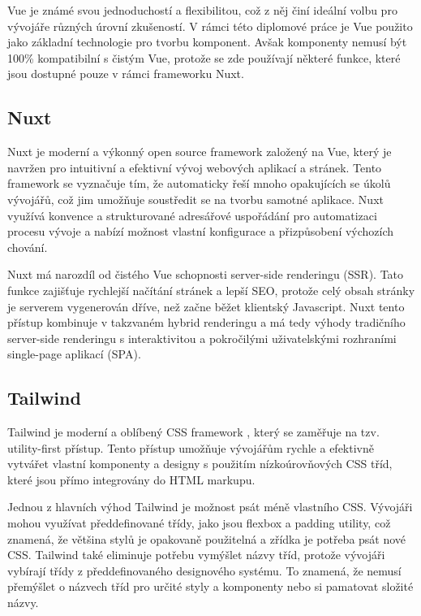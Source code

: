 Vue je známé svou jednoduchostí a flexibilitou, což z něj činí ideální volbu pro vývojáře různých úrovní zkušeností. V rámci této diplomové práce je Vue použito jako základní technologie pro tvorbu komponent. Avšak komponenty nemusí být 100\% kompatibilní s čistým Vue, protože se zde používají některé funkce, které jsou dostupné pouze v rámci frameworku Nuxt.

\subsection{Nuxt}
Nuxt je moderní a výkonný open source framework založený na Vue, který je navržen pro intuitivní a efektivní vývoj webových aplikací a stránek. Tento framework se vyznačuje tím, že automaticky řeší mnoho opakujících se úkolů vývojářů, což jim umožňuje soustředit se na tvorbu samotné aplikace. Nuxt využívá konvence a strukturované adresářové uspořádání pro automatizaci procesu vývoje a nabízí možnost vlastní konfigurace a přizpůsobení výchozích chování.

Nuxt má narozdíl od čistého Vue schopnosti server-side renderingu (SSR). Tato funkce zajišťuje rychlejší načítání stránek a lepší SEO, protože celý obsah stránky je serverem vygenerován dříve, než začne běžet klientský Javascript. Nuxt tento přístup kombinuje v takzvaném hybrid renderingu a má tedy výhody tradičního server-side renderingu s interaktivitou a pokročilými uživatelskými rozhraními single-page aplikací (SPA). \cite{NuxtRenderingModes}

\subsection{Tailwind}
Tailwind je moderní a oblíbený CSS framework \cite{StateOfCSS} \cite{StateOfFrontend}, který se zaměřuje na tzv. utility-first přístup. Tento přístup umožňuje vývojářům rychle a efektivně vytvářet vlastní komponenty a designy s použitím nízkoúrovňových CSS tříd, které jsou přímo integrovány do HTML markupu.

Jednou z hlavních výhod Tailwind je možnost psát méně vlastního CSS. Vývojáři mohou využívat předdefinované třídy, jako jsou flexbox a padding utility, což znamená, že většina stylů je opakovaně použitelná a zřídka je potřeba psát nové CSS. Tailwind také eliminuje potřebu vymýšlet názvy tříd, protože vývojáři vybírají třídy z předdefinovaného designového systému. To znamená, že nemusí přemýšlet o  názvech tříd pro určité styly a komponenty nebo si pamatovat složité názvy. \cite{TailwindUtilityFirst}

